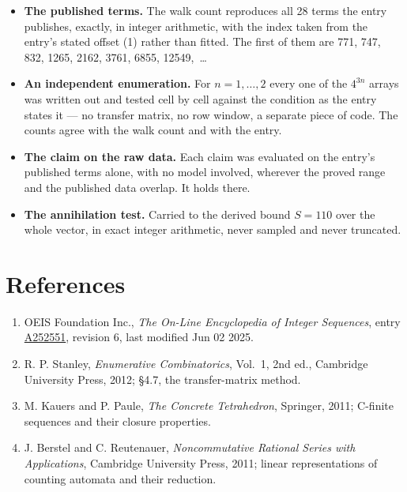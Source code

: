 \documentclass[11pt]{article}
\theoremstyle{definition}
\begin{document}
\begin{itemize}

\item {\bfseries The published terms.} The walk count reproduces all 28 terms the entry publishes, exactly, in integer arithmetic, with the index taken from the entry's stated offset (1) rather than fitted. The first of them are 771, 747, 832, 1265, 2162, 3761, 6855, 12549,~\dots

\item {\bfseries An independent enumeration.} For $n = 1,\dots,2$ every one of the $4^{3n}$ arrays was written out and tested cell by cell against the condition as the entry states it --- no transfer matrix, no row window, a separate piece of code. The counts agree with the walk count and with the entry.

\item {\bfseries The claim on the raw data.} Each claim was evaluated on the entry's published terms alone, with no model involved, wherever the proved range and the published data overlap. It holds there.

\item {\bfseries The annihilation test.} Carried to the derived bound $S = 110$ over the whole vector, in exact integer arithmetic, never sampled and never truncated.

\end{itemize}

\section{References}

\begin{enumerate}

\item OEIS Foundation Inc., \emph{The On-Line Encyclopedia of Integer Sequences}, entry \href{https://oeis.org/A252551}{A252551}, revision 6, last modified Jun 02 2025.

\item R. P. Stanley, \emph{Enumerative Combinatorics}, Vol.~1, 2nd ed., Cambridge University Press, 2012; \S4.7, the transfer-matrix method.

\item M. Kauers and P. Paule, \emph{The Concrete Tetrahedron}, Springer, 2011; C-finite sequences and their closure properties.

\item J. Berstel and C. Reutenauer, \emph{Noncommutative Rational Series with Applications}, Cambridge University Press, 2011; linear representations of counting automata and their reduction.

\end{enumerate}
\end{document}
